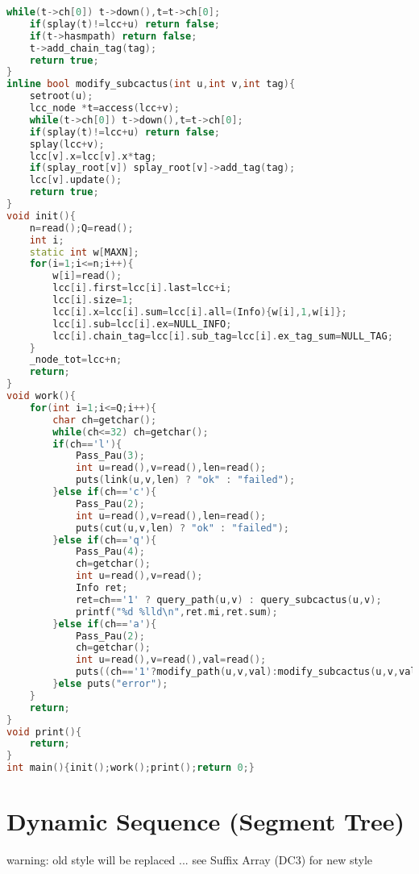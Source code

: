 \documentclass{book}
\begin{document}
\begin{lstlisting}[language=C++,title={Dynamic Cactus.hpp (14822 bytes, 608 lines)}]
	while(t->ch[0]) t->down(),t=t->ch[0];
	if(splay(t)!=lcc+u) return false;
	if(t->hasmpath) return false;
	t->add_chain_tag(tag);
	return true;
}
inline bool modify_subcactus(int u,int v,int tag){
	setroot(u);
	lcc_node *t=access(lcc+v);
	while(t->ch[0]) t->down(),t=t->ch[0];
	if(splay(t)!=lcc+u) return false;
	splay(lcc+v);
	lcc[v].x=lcc[v].x*tag;
	if(splay_root[v]) splay_root[v]->add_tag(tag);
	lcc[v].update();
	return true;
}
void init(){
	n=read();Q=read();
	int i;
	static int w[MAXN];
	for(i=1;i<=n;i++){
		w[i]=read();
		lcc[i].first=lcc[i].last=lcc+i;
		lcc[i].size=1;
		lcc[i].x=lcc[i].sum=lcc[i].all=(Info){w[i],1,w[i]};
		lcc[i].sub=lcc[i].ex=NULL_INFO;
		lcc[i].chain_tag=lcc[i].sub_tag=lcc[i].ex_tag_sum=NULL_TAG;
	}
	_node_tot=lcc+n;
	return;
}
void work(){
	for(int i=1;i<=Q;i++){
		char ch=getchar();
		while(ch<=32) ch=getchar();
		if(ch=='l'){
			Pass_Pau(3);
			int u=read(),v=read(),len=read();
			puts(link(u,v,len) ? "ok" : "failed");
		}else if(ch=='c'){
			Pass_Pau(2);
			int u=read(),v=read(),len=read();
			puts(cut(u,v,len) ? "ok" : "failed");
		}else if(ch=='q'){
			Pass_Pau(4);
			ch=getchar();
			int u=read(),v=read();
			Info ret;
			ret=ch=='1' ? query_path(u,v) : query_subcactus(u,v);
			printf("%d %lld\n",ret.mi,ret.sum);
		}else if(ch=='a'){
			Pass_Pau(2);
			ch=getchar();
			int u=read(),v=read(),val=read();
			puts((ch=='1'?modify_path(u,v,val):modify_subcactus(u,v,val)) ? "ok" : "failed");
		}else puts("error");
	}
	return;
}
void print(){
	return;
}
int main(){init();work();print();return 0;}\end{lstlisting}
\section{Dynamic Sequence (Segment Tree)}
warning: old style will be replaced ... see Suffix Array (DC3) for new style\begin{lstlisting}[language=C++,title={Dynamic Sequence (Segment Tree).hpp (0 bytes, 0 lines)}]
\end{lstlisting}
\end{document}
